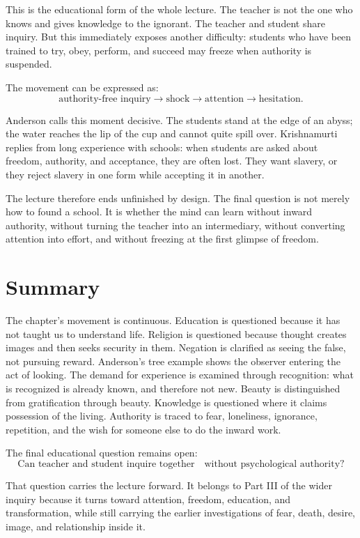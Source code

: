 This is the educational form of the whole lecture. The teacher is not the one who knows and gives knowledge to the ignorant. The teacher and student share inquiry. But this immediately exposes another difficulty: students who have been trained to try, obey, perform, and succeed may freeze when authority is suspended.

The movement can be expressed as:
\begin{equation}
\text{authority-free inquiry}
\longrightarrow
\text{shock}
\longrightarrow
\text{attention}
\longrightarrow
\text{hesitation}.
\end{equation}

Anderson calls this moment decisive. The students stand at the edge of an abyss; the water reaches the lip of the cup and cannot quite spill over. Krishnamurti replies from long experience with schools: when students are asked about freedom, authority, and acceptance, they are often lost. They want slavery, or they reject slavery in one form while accepting it in another.

The lecture therefore ends unfinished by design. The final question is not merely how to found a school. It is whether the mind can learn without inward authority, without turning the teacher into an intermediary, without converting attention into effort, and without freezing at the first glimpse of freedom.

\section{Summary}

The chapter's movement is continuous. Education is questioned because it has not taught us to understand life. Religion is questioned because thought creates images and then seeks security in them. Negation is clarified as seeing the false, not pursuing reward. Anderson's tree example shows the observer entering the act of looking. The demand for experience is examined through recognition: what is recognized is already known, and therefore not new. Beauty is distinguished from gratification through beauty. Knowledge is questioned where it claims possession of the living. Authority is traced to fear, loneliness, ignorance, repetition, and the wish for someone else to do the inward work.

The final educational question remains open:
\begin{equation}
\text{Can teacher and student inquire together}
\quad
\text{without psychological authority?}
\end{equation}

That question carries the lecture forward. It belongs to Part III of the wider inquiry because it turns toward attention, freedom, education, and transformation, while still carrying the earlier investigations of fear, death, desire, image, and relationship inside it.